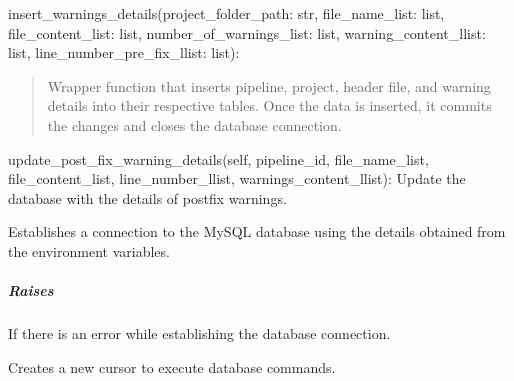 \documentclass[letterpaper,10pt,english]{sphinxmanual}
\begin{document}
\begin{fulllineitems}
\sphinxAtStartPar
insert\_warnings\_details(project\_folder\_path: str, file\_name\_list: list, file\_content\_list: list,
number\_of\_warnings\_list: list, warning\_content\_llist: list, line\_number\_pre\_fix\_llist: list):
\begin{quote}

\sphinxAtStartPar
Wrapper function that inserts pipeline, project, header file, and warning details into their respective tables.
Once the data is inserted, it commits the changes and closes the database connection.
\end{quote}

\sphinxAtStartPar
update\_post\_fix\_warning\_details(self, pipeline\_id, file\_name\_list, file\_content\_list, line\_number\_llist,
warnings\_content\_llist):
Update the database with the details of post\sphinxhyphen{}fix warnings.

\begin{fulllineitems}
\label{\detokenize{main.db_operations:main.db_operations.db_insertion_handler.DBInsertionHandler.connect_to_database}}
\pysigstartsignatures
{}
\pysigstopsignatures
\sphinxAtStartPar
Establishes a connection to the MySQL database using the details obtained from the environment variables.


\subparagraph{Raises}
\label{\detokenize{main.db_operations:raises}}\begin{description}
\sphinxAtStartPar
If there is an error while establishing the database connection.

\end{description}

\end{fulllineitems}


\begin{fulllineitems}
\label{\detokenize{main.db_operations:main.db_operations.db_insertion_handler.DBInsertionHandler.create_cursor}}
\pysigstartsignatures
{}
\pysigstopsignatures
\sphinxAtStartPar
Creates a new cursor to execute database commands.



\end{fulllineitems}
\end{fulllineitems}
\end{document}

